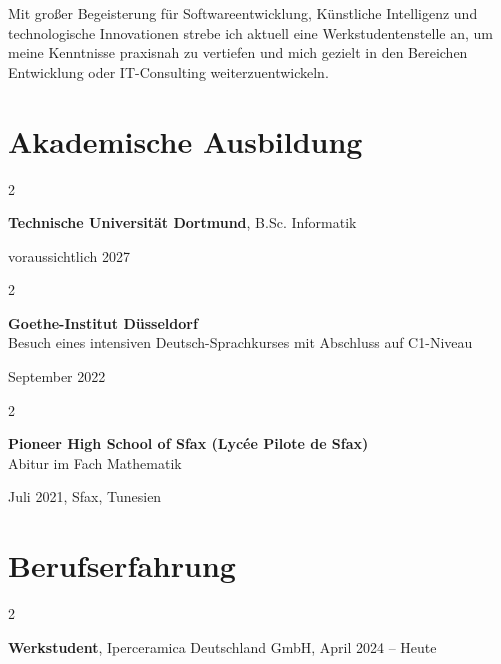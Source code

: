 \documentclass[10pt, letterpaper]{article}
\newenvironment{twocolentry}[2][]{
    \onecolentry
    \def\secondColumn{#2}
    \setcolumnwidth{\fill, 4.5 cm}
    \begin{paracol}{2}
}{
    \switchcolumn \raggedleft \secondColumn
    \end{paracol}
    \endonecolentry
} %
\begin{document}
Mit großer Begeisterung für Softwareentwicklung, Künstliche Intelligenz und technologische Innovationen strebe ich aktuell eine Werkstudentenstelle an, um meine Kenntnisse praxisnah zu vertiefen und mich gezielt in den Bereichen Entwicklung oder IT-Consulting weiterzuentwickeln.

\section{Akademische Ausbildung}

\begin{twocolentry}{
      voraussichtlich 2027
}
    \textbf{Technische Universität Dortmund}, B.Sc. Informatik

    \vspace{0.10 cm}
   
        
       \end{twocolentry}
             
             
\vspace{0.2 cm}
\begin{twocolentry}{
    September 2022
}
    \textbf{Goethe-Institut Düsseldorf} \\
   Besuch eines intensiven Deutsch-Sprachkurses mit Abschluss auf C1-Niveau 
\end{twocolentry}
\vspace{0.2cm}

\begin{twocolentry}{
    Juli 2021, Sfax, Tunesien}

    \textbf{Pioneer High School of Sfax (Lycée Pilote de Sfax)}\\

   
     
             Abitur im Fach Mathematik 


\end{twocolentry}

    
    \section{Berufserfahrung}
        
        \begin{twocolentry}{
            April 2024 – Heute 
        }
            \textbf{Werkstudent}, Iperceramica Deutschland GmbH, \end{twocolentry}
\end{document}
